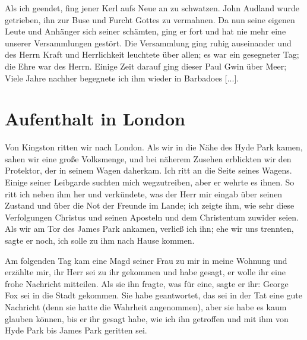 Als ich geendet,
fing jener Kerl aufs Neue an zu schwatzen. John 
Audland
wurde getrieben, ihn zur Buse und Furcht Gottes zu vermahnen.
Da nun seine eigenen Leute und Anhänger sich seiner schämten,
ging er fort und hat nie mehr eine unserer Versammlungen 
gestört. Die Versammlung ging ruhig auseinander und des Herrn
Kraft und Herrlichkeit leuchtete über allen; es war ein gesegneter
Tag; die Ehre war des Herrn. Einige Zeit darauf ging dieser
Paul Gwin über Meer; Viele Jahre nachher 
begegnete ich ihm wieder in Barbadoes [...].

\section{Aufenthalt in London}

Von Kingston ritten wir nach London. 
Als wir in die Nähe des Hyde Park kamen, 
sahen wir eine große Volksmenge, und bei
näherem Zusehen erblickten wir den Protektor, 
der in seinem
Wagen daherkam. Ich ritt an die Seite seines Wagens. Einige
seiner Leibgarde suchten mich wegzutreiben, aber er wehrte es
ihnen. So ritt ich neben ihm her und verkündete, was der Herr
mir eingab über seinen Zustand und über die Not der Freunde
im Lande; ich zeigte ihm, 
wie sehr diese Verfolgungen Christus
und seinen Aposteln und dem Christentum zuwider seien. Als wir
am Tor des James Park ankamen, verließ ich ihn; ehe wir uns
trennten, sagte er noch, ich solle zu ihm nach Hause kommen.


Am folgenden Tag kam eine Magd seiner Frau zu mir in meine
Wohnung und erzählte mir, ihr Herr sei zu ihr gekommen und
habe gesagt, er wolle ihr eine frohe Nachricht mitteilen. Als sie
ihn fragte, was für eine, sagte er ihr: George Fox sei in die
Stadt gekommen. Sie habe geantwortet, das sei in der Tat eine
gute Nachricht (denn sie hatte die Wahrheit angenommen), aber sie
habe es kaum glauben können, bis er ihr gesagt habe, wie ich ihn
getroffen und mit ihm von Hyde Park bis James Park geritten sei.


